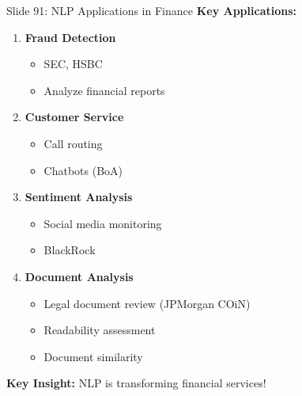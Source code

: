 \documentclass[8pt]{beamer}
\begin{document}
	\begin{frame}{Slide 91: NLP Applications in Finance}
		\fontsize{6.5}{7.5}\selectfont
		\textbf{Key Applications:}
		\begin{enumerate}
			\item \textbf{Fraud Detection}
			\begin{itemize}
				\item SEC, HSBC
				\item Analyze financial reports
			\end{itemize}
			\item \textbf{Customer Service}
			\begin{itemize}
				\item Call routing
				\item Chatbots (BoA)
			\end{itemize}
			\item \textbf{Sentiment Analysis}
			\begin{itemize}
				\item Social media monitoring
				\item BlackRock
			\end{itemize}
			\item \textbf{Document Analysis}
			\begin{itemize}
				\item Legal document review (JPMorgan COiN)
				\item Readability assessment
				\item Document similarity
			\end{itemize}
		\end{enumerate}
		
		\textcolor{myblue}{\textbf{Key Insight:}} NLP is transforming financial services!
	\end{frame}
	
\end{document}
